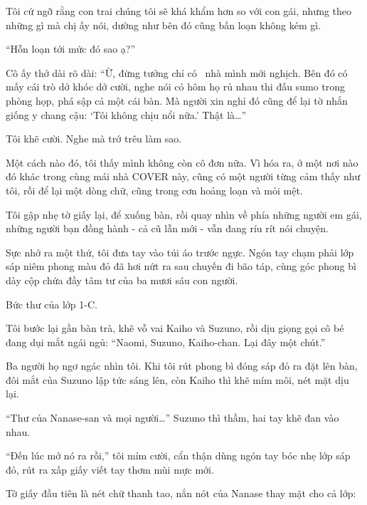 \documentclass[../main.tex]{subfiles}
\begin{document}
Tôi cứ ngỡ rằng con trai chúng tôi sẽ khá khẩm hơn so với con gái, nhưng theo những gì mà chị ấy nói, dường như bên đó cũng bấn loạn không kém gì.

``Hỗn loạn tới mức đó sao ạ?''

Cô ấy thở dài rõ dài: ``Ừ, đừng tưởng chỉ có \hll\ nhà mình mới nghịch. Bên đó có mấy cái trò dở khóc dở cười, nghe nói có hôm họ rủ nhau thi đấu sumo trong phòng họp, phá sập cả một cái bàn. Mà người xin nghỉ đó cũng để lại tờ nhắn giống y chang cậu: `Tôi không chịu nổi nữa.' Thật là\dots''

Tôi khẽ cười. Nghe mà trớ trêu làm sao.

Một cách nào đó, tôi thấy mình không còn cô đơn nữa. Vì hóa ra, ở một nơi nào đó khác trong cùng mái nhà COVER này, cũng có một người từng cảm thấy như tôi, rồi để lại một dòng chữ, cũng trong cơn hoảng loạn và mỏi mệt.

Tôi gập nhẹ tờ giấy lại, để xuống bàn, rồi quay nhìn về phía những người em gái, những người bạn đồng hành - cả cũ lẫn mới - vẫn đang ríu rít nói chuyện.

Sực nhớ ra một thứ, tôi đưa tay vào túi áo trước ngực. Ngón tay chạm phải lớp sáp niêm phong màu đỏ đã hơi nứt ra sau chuyến đi bão táp, cùng góc phong bì dày cộp chứa đầy tâm tư của ba mươi sáu con người.

Bức thư của lớp 1-C.

Tôi bước lại gần bàn trà, khẽ vỗ vai Kaiho và Suzuno, rồi dịu giọng gọi cô bé đang dụi mắt ngái ngủ: ``Naomi, Suzuno, Kaiho-chan. Lại đây một chút.''

Ba người họ ngơ ngác nhìn tôi. Khi tôi rút phong bì đóng sáp đỏ ra đặt lên bàn, đôi mắt của Suzuno lập tức sáng lên, còn Kaiho thì khẽ mím môi, nét mặt dịu lại.

``Thư của Nanase-san và mọi người\dots'' Suzuno thì thầm, hai tay khẽ đan vào nhau.

``Đến lúc mở nó ra rồi,'' tôi mỉm cười, cẩn thận dùng ngón tay bóc nhẹ lớp sáp đỏ, rút ra xấp giấy viết tay thơm mùi mực mới.

Tờ giấy đầu tiên là nét chữ thanh tao, nắn nót của Nanase thay mặt cho cả lớp:

\end{document}
